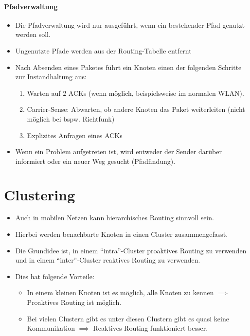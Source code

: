 \documentclass[a4paper, 11pt, accentcolor = tud3b]{tudreport}
\begin{document}
			    \paragraph{Pfadverwaltung}
				    \begin{itemize}
				    	\item Die Pfadverwaltung wird nur ausgeführt, wenn ein bestehender Pfad genutzt werden soll.
				    	\item Ungenutzte Pfade werden aus der Routing-Tabelle entfernt
				    	\item Nach Absenden eines Paketes führt ein Knoten einen der folgenden Schritte zur Instandhaltung aus:
					    	\begin{enumerate}
					    		\item Warten auf 2 ACKs (wenn möglich, beispielsweise im normalen WLAN).
					    		\item Carrier-Sense: Abwarten, ob andere Knoten das Paket weiterleiten (nicht möglich bei bspw. Richtfunk)
					    		\item Explizites Anfragen eines ACKs
					    	\end{enumerate}
				    	\item Wenn ein Problem aufgetreten ist, wird entweder der Sender darüber informiert oder ein neuer Weg gesucht (Pfadfindung).
				    \end{itemize}
	    
	    \section{Clustering}
		    \begin{itemize}
		    	\item Auch in mobilen Netzen kann hierarchisches Routing sinnvoll sein.
		    	\item Hierbei werden benachbarte Knoten in einen Cluster zusammengefasst.
		    	\item Die Grundidee ist, in einem \enquote{intra}-Cluster proaktives Routing zu verwenden und in einem \enquote{inter}-Cluster reaktives Routing zu verwenden.
		    	\item Dies hat folgende Vorteile:
			    	\begin{itemize}
			    		\item In einem kleinen Knoten ist es möglich, alle Knoten zu kennen $ \implies $ Proaktives Routing ist möglich.
			    		\item Bei vielen Clustern gibt es unter diesen Clustern gibt es quasi keine Kommunikation $ \implies $ Reaktives Routing funktioniert besser.
			    	\end{itemize}
		    \end{itemize}
		    
\end{document}
